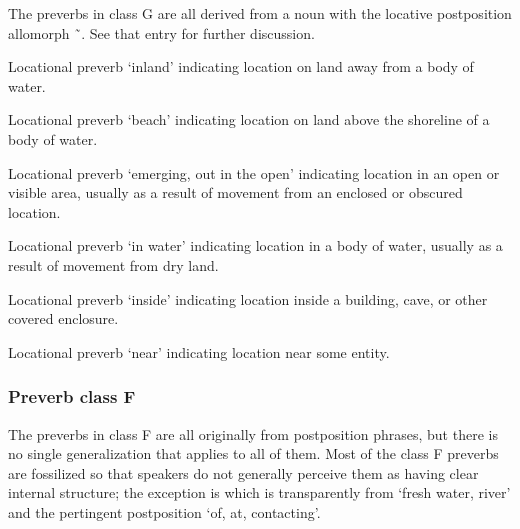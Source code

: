 The preverbs in class G are all derived from a noun
	with the locative postposition allomorph  \~\ .
See that entry for further discussion.

\begin{morphdesc}
\item[\X{dáag̱i=}]
	Locational preverb ‘inland’ indicating location on land away from a body of water.
\item[\X{éeg̱i=}]
\item[\X{éig̱i=}]
	Locational preverb ‘beach’ indicating location on land above the shoreline of a body of water.
\item[\X{gági=}]
	Locational preverb ‘emerging, out in the open’ indicating location in an open or visible area,
		usually as a result of movement from an enclosed or obscured location.
\item[\X{héeni=}]
	Locational preverb ‘in water’ indicating location in a body of water,
		usually as a result of movement from dry land.
\item[\X{neilí=}]
	Locational preverb ‘inside’ indicating location inside a building, cave,
		or other covered enclosure.
\item[\X{x̱áni=}]
	Locational preverb ‘near’ indicating location near some entity.
\end{morphdesc}

\subsubsection{Preverb class F}\label{sec:inventory-preverb-F}

The preverbs in class F are all originally from postposition phrases, but there is no single
	generalization that applies to all of them.
Most of the class F preverbs are fossilized so that speakers do not generally perceive them as having
	clear internal structure; the exception is  which is transparently from
	 ‘fresh water, river’ and the pertingent postposition
	 ‘of, at, contacting’.

